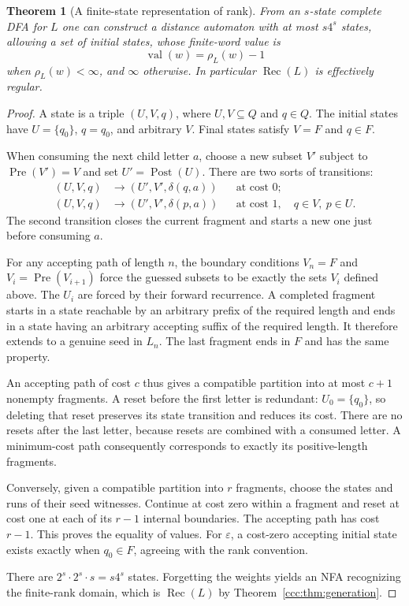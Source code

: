 \documentclass[11pt,letterpaper]{article}
\newtheorem{theorem}{Theorem}[section]
\theoremstyle{definition}
\theoremstyle{remark}
\newcommand{\eps}{\varepsilon}
\newcommand{\rec}{\operatorname{Rec}}
\newcommand{\Post}{\operatorname{Post}}
\newcommand{\Pre}{\operatorname{Pre}}
\newcommand{\rank}{\rho}
\begin{document}
\begin{theorem}[A finite-state representation of rank]
\label{ccc:thm:distance}
From an $s$-state complete DFA for $L$ one can construct a distance automaton
with at most $s4^s$ states, allowing a set of initial states, whose finite-word
value is
\[
 \operatorname{val}(w)=\rank_L(w)-1
\]
when $\rank_L(w)<\infty$, and $\infty$ otherwise.
In particular $\rec(L)$ is effectively regular.
\end{theorem}
\begin{proof}
A state is a triple $(U,V,q)$, where $U,V\subseteq Q$ and $q\in Q$.
The initial states have $U=\{q_0\}$, $q=q_0$, and arbitrary $V$.
Final states satisfy $V=F$ and $q\in F$.

When consuming the next child letter $a$, choose a new subset $V'$ subject
to $\Pre(V')=V$ and set $U'=\Post(U)$. There are two sorts of transitions:
\begin{align*}
 (U,V,q)&\longrightarrow(U',V',\delta(q,a))
 &&\text{at cost }0;\\
 (U,V,q)&\longrightarrow(U',V',\delta(p,a))
 &&\text{at cost }1,
 \quad q\in V,\ p\in U.
\end{align*}
The second transition closes the current fragment and starts a new one just
before consuming $a$.

For any accepting path of length $n$, the boundary conditions $V_n=F$ and
$V_i=\Pre(V_{i+1})$ force the guessed subsets to be exactly the sets $V_i$
defined above. The $U_i$ are forced by their forward recurrence. A completed
fragment starts in a state reachable by an arbitrary prefix of the required
length and ends in a state having an arbitrary accepting suffix of the
required length. It therefore extends to a genuine seed in $L_n$.
The last fragment ends in $F$ and has the same property.

An accepting path of cost $c$ thus gives a compatible partition into at most
$c+1$ nonempty fragments. A reset before the first letter is redundant:
$U_0=\{q_0\}$, so deleting that reset preserves its state transition and
reduces its cost. There are no resets after the last letter, because resets
are combined with a consumed letter. A minimum-cost path consequently
corresponds to exactly its positive-length fragments.

Conversely, given a compatible partition into $r$ fragments, choose the
states and runs of their seed witnesses. Continue at cost zero within a
fragment and reset at cost one at each of its $r-1$ internal boundaries.
The accepting path has cost $r-1$. This proves the equality of values.
For $\eps$, a cost-zero accepting initial state exists exactly when
$q_0\in F$, agreeing with the rank convention.

There are $2^s\cdot2^s\cdot s=s4^s$ states. Forgetting the weights yields an
NFA recognizing the finite-rank domain, which is $\rec(L)$ by
Theorem~\ref{ccc:thm:generation}.
\end{proof}
\end{document}
